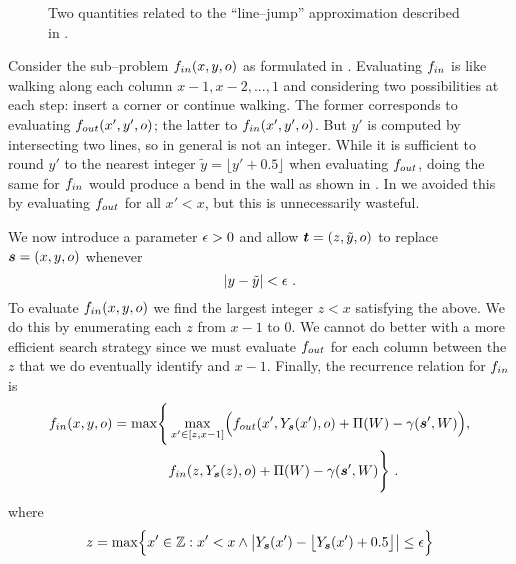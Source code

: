 \begin{figure}[tb]%
  \centering
  \qquad
  \caption{Two quantities related to the ``line--jump'' approximation
    described in .}
  \label{fig:line-jump}
\end{figure}

Consider the sub--problem $\SubProbIN(x,y,\WallOrient)$ as formulated
in . Evaluating $\SubProbIN$ is like
walking along each column $x-1,x-2,...,1$ and considering two
possibilities at each step: insert a corner or continue walking. The
former corresponds to evaluating $\SubProbOUT(x',y',\WallOrient)$; the
latter to $\SubProbIN(x',y',\WallOrient)$. But $y'$ is computed by
intersecting two lines, so in general is not an integer. While it
is sufficient to round $y'$ to the nearest integer $\tilde{y}=\lfloor
y'+0.5 \rfloor$ when evaluating $\SubProbOUT$, doing the same for
$\SubProbIN$ would produce a bend in the wall as shown in
. In  we avoided this
by evaluating $\SubProbOUT$ for all $x'<x$, but this is unnecessarily
wasteful.

We now introduce a parameter $\RoundoffEps>0$ and allow
$\OtherState=(z,\tilde{y},\WallOrient)$ to replace
$\State=(x,y,\WallOrient)$ whenever
\begin{equation}
  |y-\tilde{y}| < \RoundoffEps ~.
  \label{eq:eps}
\end{equation}
To evaluate $\SubProbIN(x,y,\WallOrient)$ we find the largest integer
$z<x$ satisfying the above. We do this by enumerating  each $z$
from $x-1$ to $0$. We cannot do better with a more efficient search
strategy since we must evaluate $\SubProbOUT$ for each column between
the $z$ that we do eventually identify and $x-1$. Finally, the
recurrence relation for $\SubProbIN$ is
\begin{equation}
  \label{eq:fin-recurrence-final}
  \begin{split}
    \SubProbIN(x,y,\WallOrient) = 
    \max \Biggl\{&
      \max_{x'\in[z,x-1]}\limits \Bigl(
        \SubProbOUT(x',Y_{\State}(x'),\WallOrient) 
        + \ScenePayoff(\Wall) 
        - \CornerPenalty(\State', \Wall)
      \Bigr),\\
      & \SubProbIN(z, Y_{\State}(z), \WallOrient)
      + \ScenePayoff(\Wall) 
      - \CornerPenalty(\State', \Wall)
    \Biggr\} ~.
  \end{split}
\end{equation}
where
\begin{equation}
  z = \max \Bigl\{x'\in\Ints : x'<x \wedge
    \bigl|Y_{\State}(x') - \bigl\lfloor Y_{\State}(x') + 0.5 \bigr\rfloor\bigr|
    \leq \RoundoffEps \Bigr\}
\end{equation}

